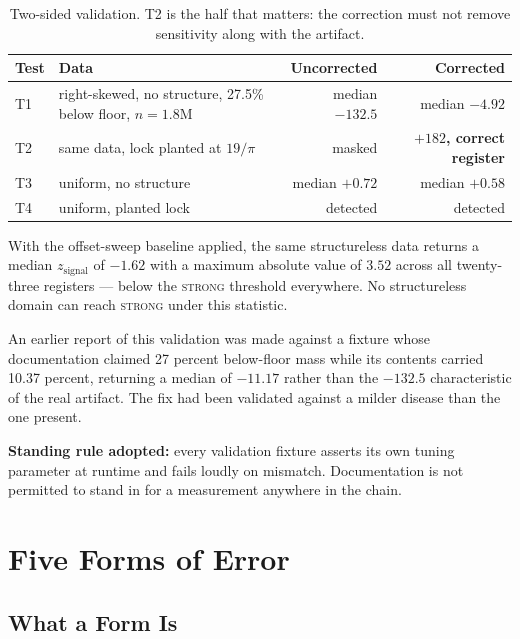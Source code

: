 \documentclass[11pt, letterpaper, openany]{book}
\begin{document}
\begin{table}[H]
\centering
\small
\begin{tabular}{@{}llrr@{}}
\toprule
\textbf{Test} & \textbf{Data} & \textbf{Uncorrected} & \textbf{Corrected} \\
\midrule
T1 & right-skewed, no structure, 27.5\% below floor, $n=1.8$M & median $-132.5$ & median $-4.92$ \\
T2 & same data, lock planted at $19/\pi$ & masked & \textbf{$+182$, correct register} \\
T3 & uniform, no structure & median $+0.72$ & median $+0.58$ \\
T4 & uniform, planted lock & detected & detected \\
\bottomrule
\end{tabular}
\caption{Two-sided validation. T2 is the half that matters: the correction must not remove
sensitivity along with the artifact.}
\end{table}

With the offset-sweep baseline applied, the same structureless data returns a median
$z_{\text{signal}}$ of $-1.62$ with a maximum absolute value of $3.52$ across all
twenty-three registers --- below the \textsc{strong} threshold everywhere. No structureless
domain can reach \textsc{strong} under this statistic.

\begin{correctionbox}
An earlier report of this validation was made against a fixture whose documentation claimed
27 percent below-floor mass while its contents carried 10.37 percent, returning a median of
$-11.17$ rather than the $-132.5$ characteristic of the real artifact. The fix had been
validated against a milder disease than the one present.

\medskip
\noindent \textbf{Standing rule adopted:} every validation fixture asserts its own tuning
parameter at runtime and fails loudly on mismatch. Documentation is not permitted to stand in
for a measurement anywhere in the chain.
\end{correctionbox}

\chapter{Five Forms of Error}

\section{What a Form Is}
\end{document}
